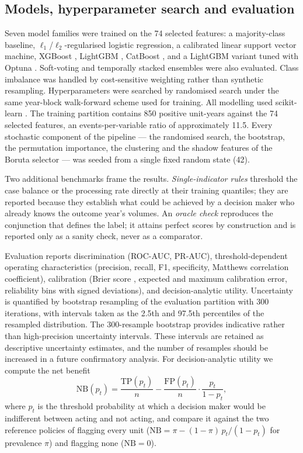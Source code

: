 \documentclass[sn-vancouver,Numbered]{sn-jnl}
\begin{document}
\subsection{Models, hyperparameter search and evaluation}

Seven model families were trained on the 74 selected features: a majority-class baseline, $\ell_1$/$\ell_2$-regularised logistic regression, a calibrated linear support vector machine, XGBoost \cite{chen_xgboost_2016}, LightGBM \cite{ke_lightgbm_2017}, CatBoost \cite{prokhorenkova_catboost_2018}, and a LightGBM variant tuned with Optuna \cite{akiba_optuna_2019}. Soft-voting and temporally stacked ensembles were also evaluated. Class imbalance was handled by cost-sensitive weighting rather than synthetic resampling. Hyperparameters were searched by randomised search under the same year-block walk-forward scheme used for training. All modelling used scikit-learn \cite{pedregosa_scikitlearn_2011}. The training partition contains 850 positive unit-years against the 74 selected features, an events-per-variable ratio of approximately 11.5. Every stochastic component of the pipeline --- the randomised search, the bootstrap, the permutation importance, the clustering and the shadow features of the Boruta selector --- was seeded from a single fixed random state (42).

Two additional benchmarks frame the results. \emph{Single-indicator rules} threshold the case balance or the processing rate directly at their training quantiles; they are reported because they establish what could be achieved by a decision maker who already knows the outcome year's volumes. An \emph{oracle check} reproduces the conjunction that defines the label; it attains perfect scores by construction and is reported only as a sanity check, never as a comparator.

Evaluation reports discrimination (ROC-AUC, PR-AUC), threshold-dependent operating characteristics (precision, recall, F1, specificity, Matthews correlation coefficient), calibration (Brier score \cite{brier_verification_1950}, expected and maximum calibration error, reliability bins with signed deviations), and decision-analytic utility. Uncertainty is quantified by bootstrap resampling of the evaluation partition with 300 iterations, with intervals taken as the 2.5th and 97.5th percentiles of the resampled distribution. The 300-resample bootstrap provides indicative rather than high-precision uncertainty intervals. These intervals are retained as descriptive uncertainty estimates, and the number of resamples should be increased in a future confirmatory analysis.
For decision-analytic utility we compute the net benefit \cite{vickers_decision_2006}
\begin{equation}\label{eq:nb}
\mathrm{NB}(p_t) = \frac{\mathrm{TP}(p_t)}{n} - \frac{\mathrm{FP}(p_t)}{n}\cdot\frac{p_t}{1-p_t},
\end{equation}
where $p_t$ is the threshold probability at which a decision maker would be indifferent between acting and not acting, and compare it against the two reference policies of flagging every unit ($\mathrm{NB} = \pi - (1-\pi)\,p_t/(1-p_t)$ for prevalence $\pi$) and flagging none ($\mathrm{NB} = 0$).
\end{document}
